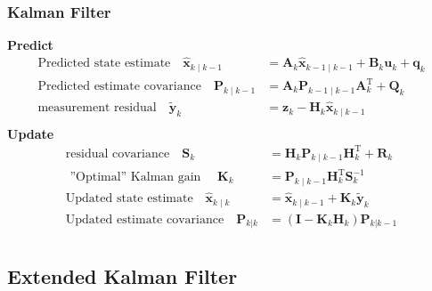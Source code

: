 \documentclass[14pt,hyperref={CJKbookmarks=true}]{beamer}
\theoremstyle{plain}
\theoremstyle{definition}
\theoremstyle{remark}
\begin{document}
\begin{frame}
\frametitle{Kalman Filter}
\small
{\bf{Predict}}
\begin{equation*}
\begin{split}
\text{Predicted state estimate} \quad \hat{\mathbf{x}}_{k\mid k-1} &= \mathbf{A}_k\hat{\mathbf{x}}_{k-1\mid k-1} + \mathbf{B}_k \mathbf{u}_k +\mathbf{q}_{k}\\
\text{Predicted estimate covariance} \quad\mathbf{P}_{k\mid k-1} &=  \mathbf{A}_k \mathbf{P}_{k-1\mid k-1} \mathbf{A}_k^\mathrm{T} + \mathbf{Q}_k\\
\text{measurement residual}\quad \tilde{\mathbf{y}}_k &= \mathbf{z}_k - \mathbf{H}_k\hat{\mathbf{x}}_{k\mid k-1}\\
\end{split}
\end{equation*}
\pause
{\bf{Update}}
\begin{equation*}
\begin{split}
\text{residual covariance}\quad\mathbf{S}_k& = \mathbf{H}_k \mathbf{P}_{k\mid k-1} \mathbf{H}_k^\mathrm{T} + \mathbf{R}_k \\
\text{ ''Optimal'' Kalman gain }\quad \mathbf{K}_k &= \mathbf{P}_{k\mid k-1}\mathbf{H}_k^\mathrm{T} \mathbf{S}_k^{-1}\\
\text{Updated state estimate}\quad \hat{\mathbf{x}}_{k\mid k} &= \hat{\mathbf{x}}_{k\mid k-1} + \mathbf{K}_k\tilde{\mathbf{y}}_k\\
\text{Updated estimate covariance}\quad\mathbf{P}_{k|k} &= (\mathbf{I} - \mathbf{K}_k \mathbf{H}_k) \mathbf{P}_{k|k-1} \\
\end{split}
\end{equation*}
\end{frame}



\subsection{Extended Kalman Filter}
\end{document}
